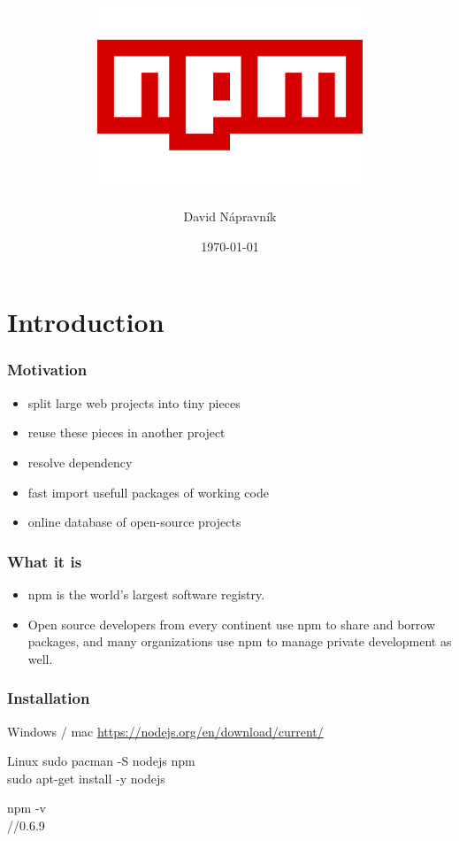 \documentclass{beamer}
\title[Short title]{
	\includegraphics[scale=0.4]{npm_logo}	
} %
\author{David Nápravník} %
\institute[mff] %
{
Charles University \\ %
\medskip
\textit{ebrithil@nogare.cz} %
}
\date{\today} %
\begin{document}
\begin{frame}
\titlepage %
\end{frame}


\section{Introduction}

\begin{frame}
\frametitle{Motivation}
\begin{itemize}
\item split large web projects into tiny pieces
\item reuse these pieces in another project
\item resolve dependency
\item fast import usefull packages of working code
\item online database of open-source projects
\end{itemize}


\end{frame}

\begin{frame}
\frametitle{What it is}
\begin{itemize}
\item npm is the world’s largest software registry.
\item Open source developers from every continent use npm to share
and borrow packages, and many organizations use npm
to manage private development as well.
\end{itemize}
\end{frame}

\begin{frame}
\frametitle{Installation}
\begin{block}{Windows / mac}
\url{https://nodejs.org/en/download/current/}
\end{block}

\begin{block}{Linux}
sudo pacman -S nodejs npm\\
sudo apt-get install -y nodejs	
\end{block}

\begin{example}[verify]
npm -v\\
//0.6.9
\end{example}

\end{frame}
\end{document}
